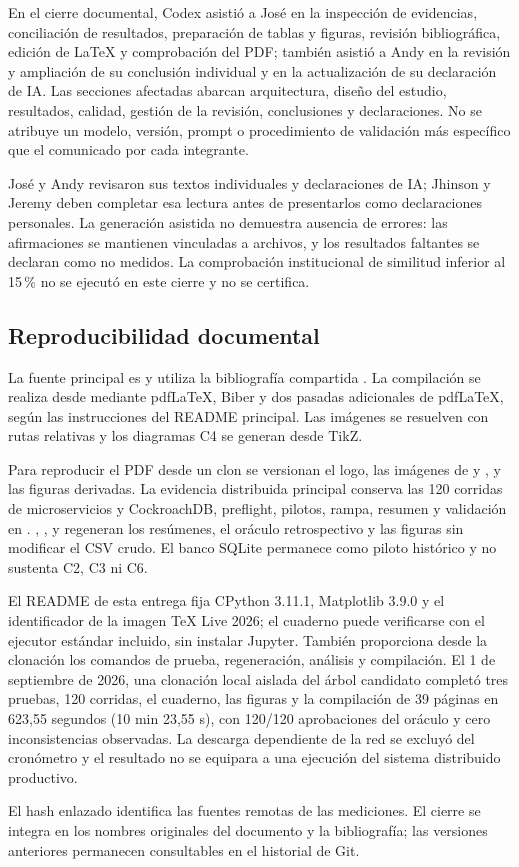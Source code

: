 \documentclass[12pt,a4paper]{article}
\begin{document}
En el cierre documental, Codex asistió a José en la inspección de evidencias, conciliación de resultados, preparación de tablas y figuras, revisión bibliográfica, edición de LaTeX y comprobación del PDF; también asistió a Andy en la revisión y ampliación de su conclusión individual y en la actualización de su declaración de IA. Las secciones afectadas abarcan arquitectura, diseño del estudio, resultados, calidad, gestión de la revisión, conclusiones y declaraciones. No se atribuye un modelo, versión, prompt o procedimiento de validación más específico que el comunicado por cada integrante.

José y Andy revisaron sus textos individuales y declaraciones de IA; Jhinson y Jeremy deben completar esa lectura antes de presentarlos como declaraciones personales. La generación asistida no demuestra ausencia de errores: las afirmaciones se mantienen vinculadas a archivos, y los resultados faltantes se declaran como no medidos. La comprobación institucional de similitud inferior al 15\,\% no se ejecutó en este cierre y no se certifica.

\subsection{Reproducibilidad documental}
La fuente principal es  y utiliza la bibliografía compartida . La compilación se realiza desde  mediante pdfLaTeX, Biber y dos pasadas adicionales de pdfLaTeX, según las instrucciones del README principal. Las imágenes se resuelven con rutas relativas y los diagramas C4 se generan desde TikZ.

Para reproducir el PDF desde un clon se versionan el logo, las imágenes de  y , y las figuras derivadas. La evidencia distribuida principal conserva las 120 corridas de microservicios y CockroachDB, preflight, pilotos, rampa, resumen y validación en . , ,  y  regeneran los resúmenes, el oráculo retrospectivo y las figuras sin modificar el CSV crudo. El banco SQLite permanece como piloto histórico y no sustenta C2, C3 ni C6.

El README de esta entrega fija CPython 3.11.1, Matplotlib 3.9.0 y el identificador de la imagen TeX Live 2026; el cuaderno puede verificarse con el ejecutor estándar incluido, sin instalar Jupyter. También proporciona desde la clonación los comandos de prueba, regeneración, análisis y compilación. El 1 de septiembre de 2026, una clonación local aislada del árbol candidato completó tres pruebas, 120 corridas, el cuaderno, las figuras y la compilación de 39 páginas en 623,55 segundos (10 min 23,55 s), con 120/120 aprobaciones del oráculo y cero inconsistencias observadas. La descarga dependiente de la red se excluyó del cronómetro y el resultado no se equipara a una ejecución del sistema distribuido productivo.

El hash enlazado identifica las fuentes remotas de las mediciones. El cierre se integra en los nombres originales del documento y la bibliografía; las versiones anteriores permanecen consultables en el historial de Git.

\clearpage
\printbibliography[heading=bibnumbered,title={Bibliografía}]
\end{document}
